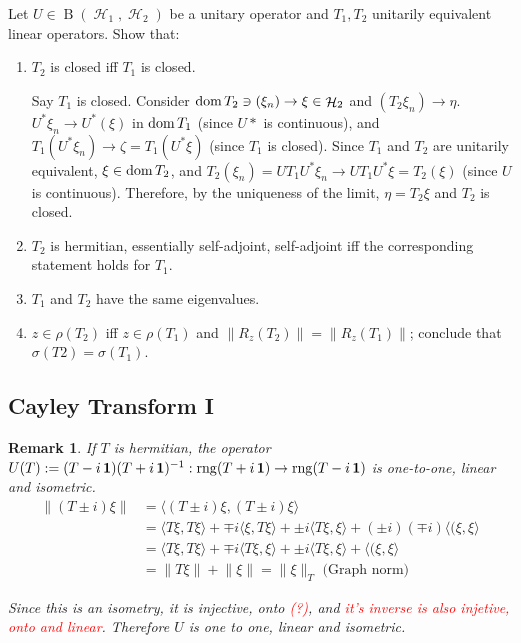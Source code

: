 \documentclass{article}
\theoremstyle{exercisestyle}
\newenvironment{exercise}[1]
  {\renewcommand\theinnerex{#1}\innerex}
  {\endinnerex}
\newtheorem{remark}{Remark}[subsection]
\DeclareMathOperator{\bounded}{B}
\DeclareMathOperator{\hilbert}{\mathcal{H}}
\DeclareMathOperator{\Id}{\textbf{1}}
\newcommand{\norm}[1]{\lVert #1 \rVert}
\newcommand{\inner}[2]{\langle #1, #2 \rangle}
\begin{document}
\begin{exercise}{2.1.26}
    Let $U \in \bounded(\hilbert_1, \hilbert_2)$ be a unitary operator and $T_1, T_2$ unitarily equivalent linear operators. Show that:
    \begin{enumerate}
        \item $T_2$ is closed iff $T_1$ is closed.


              Say $T_1$ is closed. Consider $\dom T_2 \ni(\xi_n) \to \xi \in \hilbert_2$  and $(T_2 \xi_n) \to \eta$. $U^*\xi_n \to U^*(\xi)$ in $\operatorname{dom} T_1$ (since $U*$ is continuous),
              and $T_1(U^*\xi_n) \to \zeta = T_1(U^* \xi) $ (since $T_1$ is closed). Since $T_1$ and $T_2$ are unitarily equivalent, $\xi \in \operatorname{dom} T_2$, and
              $T_2 (\xi_n) = U T_1 U^* \xi_n \to U T_1 U^* \xi = T_2 (\xi)$ (since $U$ is continuous). Therefore, by the uniqueness of the limit, $\eta = T_2 \xi$
              and $T_2$ is closed.

        \item $T_2$ is hermitian, essentially self-adjoint, self-adjoint iff the corresponding statement holds for $T_1$.



        \item $T_1$ and $T_2$ have the same eigenvalues.
        \item $z \in \rho(T_2)$ iff $z \in \rho(T_1)$ and $\norm{R_z(T_2)} = \norm{R_z (T_1)}$; conclude that $\sigma(T2) = \sigma(T_1)$.
    \end{enumerate}


\end{exercise}

\subsection{Cayley Transform I}

\begin{remark}
    If $T$ is hermitian, the operator $U (T) := (T - i\Id)(T + i\Id)^{-1}: \rng (T + i\Id) \to \rng (T - i\Id)$ is one-to-one, linear and isometric.
    \begin{align*}
        \norm{(T \pm i) \xi} & = \inner{(T \pm i) \xi}{(T \pm i) \xi}                                                                         \\
                             & = \inner{T\xi}{T \xi} + \mp i \inner{\xi}{T \xi} + \pm i \inner{T \xi}{\xi} + (\pm i)(\mp i) \inner{(\xi}{\xi} \\
                             & = \inner{T\xi}{T \xi} + \mp i \inner{T \xi}{\xi} + \pm i \inner{T \xi}{\xi} + \inner{(\xi}{\xi}                \\
                             & = \norm{T \xi} + \norm{\xi} = \norm{\xi}_{T} \text{ (Graph norm)}
    \end{align*}

    Since this is an isometry, it is injective, onto \textcolor{red}{(?)}, and \textcolor{red}{it's inverse is also injetive, onto and linear}.
    Therefore $U$ is one to one, linear and isometric.

\end{remark}
\end{document}
